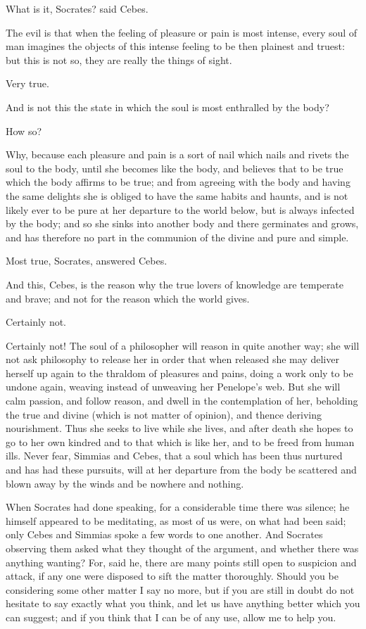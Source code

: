 What is it, Socrates? said Cebes.

The evil is that when the feeling of pleasure or pain is most intense,
every soul of man imagines the objects of this intense feeling to be then
plainest and truest: but this is not so, they are really the things of
sight.

Very true.

And is not this the state in which the soul is most enthralled by the
body?

How so?

Why, because each pleasure and pain is a sort of nail which nails and
rivets the soul to the body, until she becomes like the body, and believes
that to be true which the body affirms to be true; and from agreeing with
the body and having the same delights she is obliged to have the same
habits and haunts, and is not likely ever to be pure at her departure to
the world below, but is always infected by the body; and so she sinks into
another body and there germinates and grows, and has therefore no part in
the communion of the divine and pure and simple.

Most true, Socrates, answered Cebes.

And this, Cebes, is the reason why the true lovers of knowledge are
temperate and brave; and not for the reason which the world gives.

Certainly not.

Certainly not! The soul of a philosopher will reason in quite another way;
she will not ask philosophy to release her in order that when released she
may deliver herself up again to the thraldom of pleasures and pains, doing
a work only to be undone again, weaving instead of unweaving her
Penelope's web. But she will calm passion, and follow reason, and dwell in
the contemplation of her, beholding the true and divine (which is not
matter of opinion), and thence deriving nourishment. Thus she seeks to
live while she lives, and after death she hopes to go to her own kindred
and to that which is like her, and to be freed from human ills. Never
fear, Simmias and Cebes, that a soul which has been thus nurtured and has
had these pursuits, will at her departure from the body be scattered and
blown away by the winds and be nowhere and nothing.

When Socrates had done speaking, for a considerable time there was
silence; he himself appeared to be meditating, as most of us were, on what
had been said; only Cebes and Simmias spoke a few words to one another.
And Socrates observing them asked what they thought of the argument, and
whether there was anything wanting? For, said he, there are many points
still open to suspicion and attack, if any one were disposed to sift the
matter thoroughly. Should you be considering some other matter I say no
more, but if you are still in doubt do not hesitate to say exactly what
you think, and let us have anything better which you can suggest; and if
you think that I can be of any use, allow me to help you.

